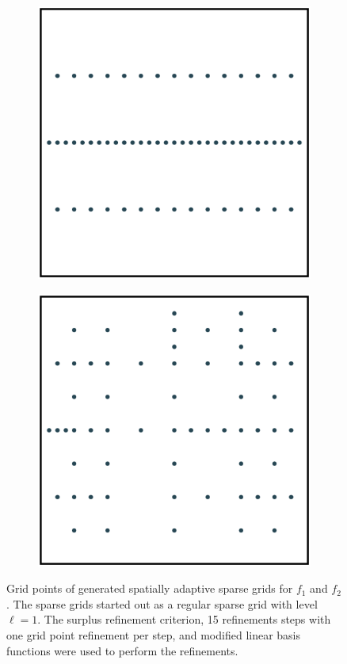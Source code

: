 \documentclass[
  a4paper,  %
  twoside,  %
  bibliography=totoc,
  headsepline,
  cleardoublepage=empty,
  parskip=half,
  draft=false
]{scrbook}
\begin{document}
\begin{mdframed}[style=style]
\begin{figure}[H]
\begin{subfigure}{.5\textwidth}
  \centering
  \includegraphics[width=.65\linewidth]{graphics/grid_f1}
  \label{fig:grid_f1}
\vspace{2.5mm}
\end{subfigure}%
\begin{subfigure}{.5\textwidth}
  \centering
  \includegraphics[width=.65\linewidth]{graphics/grid_f2}
  \label{fig:grid_f2}
\vspace{2.5mm}
\end{subfigure}
\delimit
\caption{Grid points of generated spatially adaptive sparse grids for $f_1$ and $f_2$.
The sparse grids started out as a regular sparse grid with level $\ell=1$. The surplus refinement criterion, 15 refinements steps with one grid point refinement per step, and modified linear basis functions were used to perform the refinements.}
\label{fig:grids}
\end{figure}
\end{mdframed}
\end{document}
